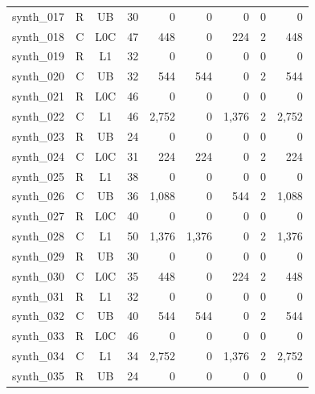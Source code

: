 \begin{longtable}{lccrrrrrr}
synth\_017 & R & UB & 30 & 0 & 0 & 0 & 0 & 0 \\
synth\_018 & C & L0C & 47 & 448 & 0 & 224 & 2 & 448 \\
synth\_019 & R & L1 & 32 & 0 & 0 & 0 & 0 & 0 \\
synth\_020 & C & UB & 32 & 544 & 544 & 0 & 2 & 544 \\
synth\_021 & R & L0C & 46 & 0 & 0 & 0 & 0 & 0 \\
synth\_022 & C & L1 & 46 & 2,752 & 0 & 1,376 & 2 & 2,752 \\
synth\_023 & R & UB & 24 & 0 & 0 & 0 & 0 & 0 \\
synth\_024 & C & L0C & 31 & 224 & 224 & 0 & 2 & 224 \\
synth\_025 & R & L1 & 38 & 0 & 0 & 0 & 0 & 0 \\
synth\_026 & C & UB & 36 & 1,088 & 0 & 544 & 2 & 1,088 \\
synth\_027 & R & L0C & 40 & 0 & 0 & 0 & 0 & 0 \\
synth\_028 & C & L1 & 50 & 1,376 & 1,376 & 0 & 2 & 1,376 \\
synth\_029 & R & UB & 30 & 0 & 0 & 0 & 0 & 0 \\
synth\_030 & C & L0C & 35 & 448 & 0 & 224 & 2 & 448 \\
synth\_031 & R & L1 & 32 & 0 & 0 & 0 & 0 & 0 \\
synth\_032 & C & UB & 40 & 544 & 544 & 0 & 2 & 544 \\
synth\_033 & R & L0C & 46 & 0 & 0 & 0 & 0 & 0 \\
synth\_034 & C & L1 & 34 & 2,752 & 0 & 1,376 & 2 & 2,752 \\
synth\_035 & R & UB & 24 & 0 & 0 & 0 & 0 & 0 \\
\end{longtable}

